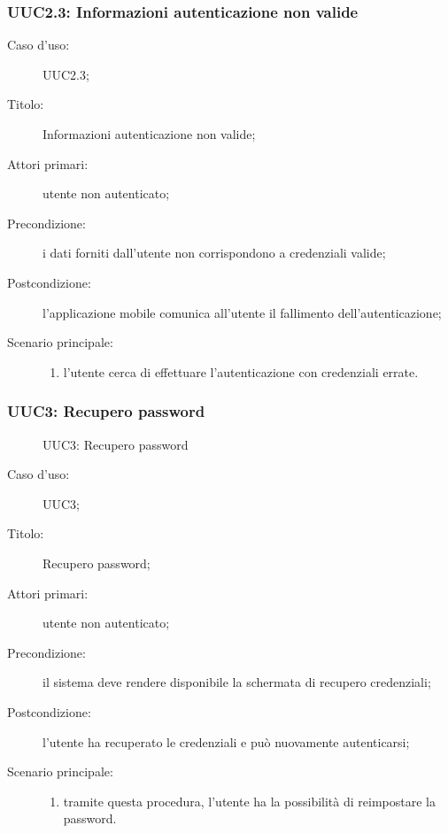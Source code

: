 \documentclass[../../../analisi-dei-requisiti.tex]{subfiles}
\begin{document}
\subsubsection{UUC2.3: Informazioni autenticazione non valide}%
\label{subs:UUC2.3}
\begin{description}
  \item[Caso d’uso:] UUC2.3;
  \item[Titolo:] Informazioni autenticazione non valide;
  \item[Attori primari:] utente non autenticato;
  \item[Precondizione:] i dati forniti dall'utente non corrispondono a credenziali valide;
  \item[Postcondizione:] l'applicazione mobile comunica all'utente il fallimento dell'autenticazione;
  \item[Scenario principale:]
        \begin{enumerate}
          \item l'utente cerca di effettuare l'autenticazione con credenziali errate.
        \end{enumerate}
\end{description}


\subsubsection{UUC3: Recupero password}%
\label{subs:UUC3}

\begin{figure}[H]
  \centering
  \caption{UUC3: Recupero password}%
  \label{fig:uuc3}
\end{figure}

\begin{description}
  \item[Caso d’uso:] UUC3;
  \item[Titolo:] Recupero password;
  \item[Attori primari:] utente non autenticato;
  \item[Precondizione:] il sistema deve rendere disponibile la schermata di recupero credenziali;
  \item[Postcondizione:] l'utente ha recuperato le credenziali e può nuovamente autenticarsi;
  \item[Scenario principale:]
        \begin{enumerate}
          \item tramite questa procedura, l’utente ha la possibilità di reimpostare la password.
        \end{enumerate}
\end{description}
\end{document}
